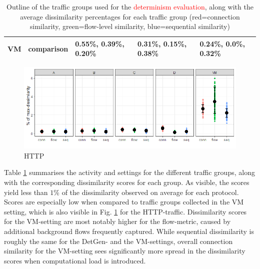 \documentclass{article}
\begin{document}
\begin{table}
\begin{tabular}{p{0.8cm}|p{2.5cm}|p{2.7cm}|p{2.7cm}|p{2.7cm}}
VM & comparison&\footnotesize \textcolor{myred}{0.55\%}, \textcolor{mygreen}{0.39\%}, \textcolor{myblue}{0.20\%}&
 \footnotesize \textcolor{myred}{0.31\%}, \textcolor{mygreen}{0.15\%}, \textcolor{myblue}{0.38\%}&
 \footnotesize \textcolor{myred}{0.24\%}, \textcolor{mygreen}{0.0\%}, \textcolor{myblue}{0.32\%}\\ \hline \hline
\end{tabular}
\caption{Outline of the traffic groups used for the \textcolor{red}{determinism evaluation}, along with the average dissimilarity percentages for each traffic group (red=connection similarity, green=flow-level similarity, blue=sequential similarity)}\label{Dataset}
\end{table}

\begin{figure}
\centering
\includegraphics[width=1\textwidth]{images/Exp1.png}
\caption{HTTP}\label{determ-metric}
\end{figure}


Table \ref{Dataset} summarises the activity and settings for the different traffic groups, along with the corresponding dissimilarity scores for each group. As visible, the scores yield less than $1\%$ of the dissimilarity observed on average for each protocol. Scores are especially low when compared to traffic groups collected in the VM setting, which is also visible in Fig. \ref{determ-metric} for the HTTP-traffic. Dissimilarity scores for the VM-setting are most notably higher for the flow-metric, caused by additional background flows frequently captured. While sequential dissimilarity is roughly the same for the DetGen- and the VM-settings, overall connection similarity for the VM-setting sees significantly more spread in the dissimilarity scores when computational load is introduced.


\end{document}
